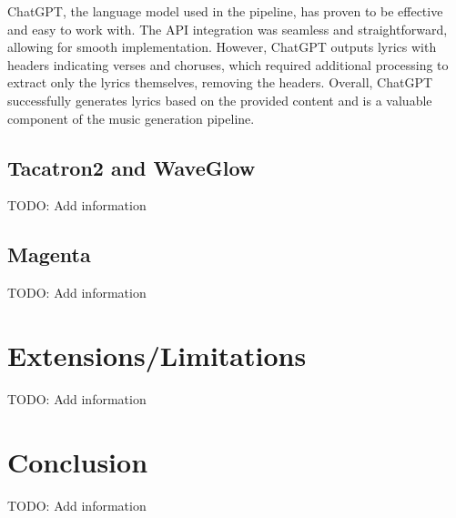 ChatGPT, the language model used in the pipeline, has proven to be effective and easy to work with. The API integration was seamless and straightforward, allowing for smooth implementation. However, ChatGPT outputs lyrics with headers indicating verses and choruses, which required additional processing to extract only the lyrics themselves, removing the headers. Overall, ChatGPT successfully generates lyrics based on the provided content and is a valuable component of the music generation pipeline.

\section{Tacatron2 and WaveGlow}
\label{sec:Tacatron2_and_WaveGlow_results}

TODO: Add information

\section{Magenta}
\label{sec:Magenta_results}

TODO: Add information

\chapter{Extensions/Limitations}
\label{chap:Extensions_and_limitations}

TODO: Add information

\chapter{Conclusion}
\label{chap:Conclusion}

TODO: Add information


\nocite{*} %

\label{chap:bibliography}

